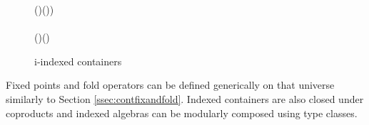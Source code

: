 \begin{figure}[t]
{\begin{minipage}{1\columnwidth}
\begin{hscode}
\>[19]{}\mathbin{::}{}\<[19E]%
\>[23]{}\forall (\mathbin{::}\;\;\;)\hsforall {}\;(\;\;\;\;))\to {}\<[E]%
\\
\>[14]{}\;\;\;\<[E]%
\\[\blanklineskip]%
\>[3]{}\;\;(\mathbin{::}\;)\;(\mathbin{::})\mathbin{::}\;\<[E]%
\\
\>[3]{}\<[5]%
\>[5]{}\mathbin{::}\;\;\;\to {}\;\;\<[E]%
\ColumnHook
\end{hscode}\resethooks
\end{minipage}
}
\caption{i-indexed containers}

\label{fig:indexedcontainers}
\end{figure}


Fixed points and fold operators can be defined generically on that
universe similarly to Section \ref{ssec:contfixandfold}. Indexed
containers are also closed under coproducts and indexed algebras can
be modularly composed using type classes.
